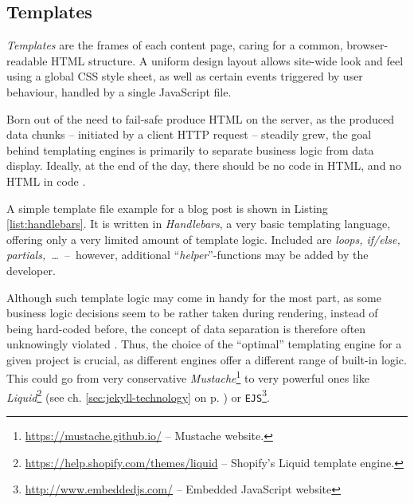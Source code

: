 \subsection{Templates}
\label{sec:buildpipelines-templates}

\emph{Templates} are the frames of each content page, caring for a common, browser-readable HTML structure. A uniform design layout allows site-wide look and feel using a global CSS style sheet, as well as certain events triggered by user behaviour, handled by a single JavaScript file.

Born out of the need to fail-safe produce HTML on the server, as the produced data chunks -- initiated by a client HTTP request -- steadily grew, the goal behind templating engines is primarily to separate business logic from data display. Ideally, at the end of the day, there should be no code in HTML, and no HTML in code \cite[225]{Parr2004templates}.



A simple template file example for a blog post is shown in Listing \ref{list:handlebars}. It is written in \emph{Handlebars}, a very basic templating language, offering only a very limited amount of template logic. Included are \emph{loops, if/else, partials,~\ldots}~--~however, additional ``\emph{helper}''-functions may be added by the developer.

Although such template logic may come in handy for the most part, as some business logic decisions seem to be rather taken during rendering, instead of being hard-coded before, the concept of data separation is therefore often unknowingly violated \cite[228]{Parr2004templates}. Thus, the choice of the ``optimal'' templating engine for a given project is crucial, as different engines offer a different range of built-in logic. This could go from very conservative \emph{Mustache}\footnote{\url{https://mustache.github.io/} -- Mustache website.} to very powerful ones like \emph{Liquid}\footnote{\url{https://help.shopify.com/themes/liquid} -- Shopify's Liquid template engine.} (see ch. \ref{sec:jekyll-technology} on p. \pageref{sec:jekyll-technology}) or \texttt{EJS}\footnote{\url{http://www.embeddedjs.com/} -- Embedded JavaScript website}.
